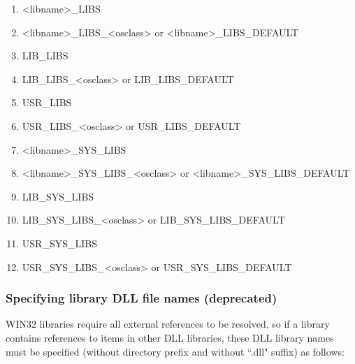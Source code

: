 \begin{enumerate}\item \textless{}libname\textgreater{}\_LIBS

\item \textless{}libname\textgreater{}\_LIBS\_\textless{}osclass\textgreater{} or \textless{}libname\textgreater{}\_LIBS\_DEFAULT

\item {}LIB\_LIBS

\item LIB\_LIBS\_\textless{}osclass\textgreater{} or LIB\_LIBS\_DEFAULT

\item {}USR\_LIBS

\item USR\_LIBS\_\textless{}osclass\textgreater{} or USR\_LIBS\_DEFAULT

\item \textless{}libname\textgreater{}\_SYS\_LIBS

\item \textless{}libname\textgreater{}\_SYS\_LIBS\_\textless{}osclass\textgreater{} or \textless{}libname\textgreater{}\_SYS\_LIBS\_DEFAULT

\item {}LIB\_SYS\_LIBS

\item LIB\_SYS\_LIBS\_\textless{}osclass\textgreater{} or LIB\_SYS\_LIBS\_DEFAULT

\item {}USR\_SYS\_LIBS

\item USR\_SYS\_LIBS\_\textless{}osclass\textgreater{} or USR\_SYS\_LIBS\_DEFAULT

\end{enumerate}

\subsubsection{Specifying library DLL file names (deprecated)}

WIN32 libraries require all external references to be resolved, so if a library contains references to items in other DLL 
libraries, these DLL library names must be specified (without directory prefix and without ``.dll" suffix) as follows:

